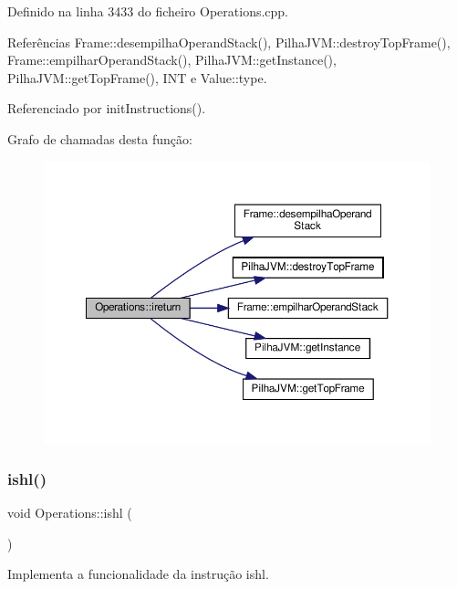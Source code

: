 Definido na linha 3433 do ficheiro Operations.\+cpp.



Referências Frame\+::desempilha\+Operand\+Stack(), Pilha\+J\+V\+M\+::destroy\+Top\+Frame(), Frame\+::empilhar\+Operand\+Stack(), Pilha\+J\+V\+M\+::get\+Instance(), Pilha\+J\+V\+M\+::get\+Top\+Frame(), I\+NT e Value\+::type.



Referenciado por init\+Instructions().

Grafo de chamadas desta função\+:
\nopagebreak
\begin{figure}[H]
\begin{center}
\leavevmode
\includegraphics[width=350pt]{classOperations_a4be12fb7c8eeee8a2f6489ec27a46dce_cgraph}
\end{center}
\end{figure}
\mbox{\label{classOperations_a3139bbe41519fb4761ecd7e2a8ddb994}} 
\subsubsection{\texorpdfstring{ishl()}{ishl()}}
{\footnotesize\ttfamily void Operations\+::ishl (\begin{DoxyParamCaption}{ }\end{DoxyParamCaption})\hspace{0.3cm}{\ttfamily [private]}}



Implementa a funcionalidade da instrução ishl. 



